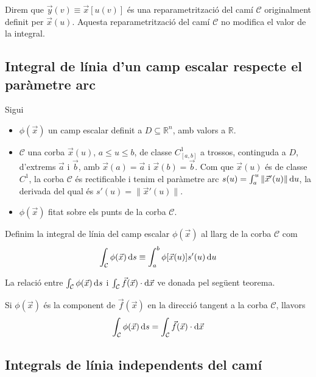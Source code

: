 Direm que $\vec{y}(v) \equiv \vec{x}[u(v)]$ és una reparametrització del camí $\mathcal{C}$ originalment definit per $\vec{x}(u)$. Aquesta reparametrització del camí $\mathcal{C}$ no modifica el valor de la integral.

\subsection{Integral de línia d'un camp escalar respecte el paràmetre arc}
Sigui
\begin{itemize}
    \item $\phi(\vec{x})$ un camp escalar definit a $D \subseteq \mathbb{R}^{n}$, amb valors a $\mathbb{R}$.
    \item $\mathcal{C}$ una corba $\vec{x}(u)$, $a\leq u \leq b$, de classe $C^{1}_{[a,b]}$ a trossos, continguda a $D$, d'extrems $\vec{a}$ i $\vec{b}$, amb $\vec{x}(a) = \vec{a}$ i $\vec{x}(b) = \vec{b}$. Com que $\vec{x}(u)$ és de classe $C^{1}$, la corba $\mathcal{C}$ és rectificable i tenim el paràmetre arc $s(u) = \int_{a}^{u} \| \vec{x}'(u) \| \mathop{}\!\mathrm{d} u$, la derivada del qual és $s'(u) = \| \vec{x}'(u) \|$.
    \item $\phi(\vec{x})$ fitat sobre els punts de la corba $\mathcal{C}$.
\end{itemize}
\begin{defi}
    Definim la integral de línia del camp escalar $\phi(\vec{x})$ al llarg de la corba $\mathcal{C}$ com
    \begin{align}
        \int_{\mathcal{C}} \phi(\vec{x}) \mathop{}\!\mathrm{d} s \equiv \int_{a}^{b} \phi[\vec{x}(u)] s'(u) \mathop{}\!\mathrm{d} u
    \end{align}
\end{defi}
La relació entre $\int_{\mathcal{C}} \phi(\vec{x}) \mathop{}\!\mathrm{d} s$ i $\int_{\mathcal{C}} \vec{f}(\vec{x}) \cdot \mathrm{d} \vec{x}$ ve donada pel següent teorema.
\begin{thm}
    Si $\phi(\vec{x})$ és la component de $\vec{f}(\vec{x})$ en la direcció tangent a la corba $\mathcal{C}$, llavors
    \begin{align}
        \int_{\mathcal{C}} \phi(\vec{x}) \mathop{}\!\mathrm{d} s = \int_{\mathcal{C}} \vec{f}(\vec{x}) \cdot \mathrm{d} \vec{x}
    \end{align}
\end{thm}

\subsection{Integrals de línia independents del camí}
